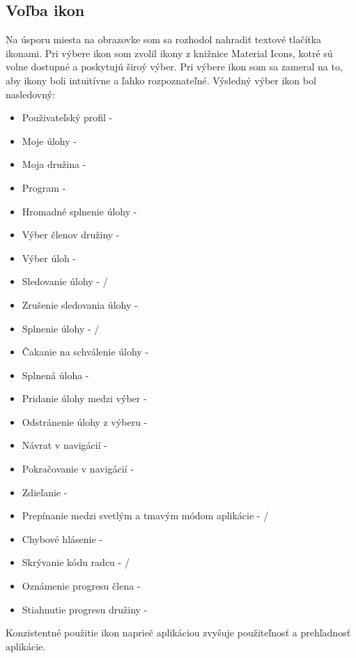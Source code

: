 \subsection{Voľba ikon}
Na úsporu miesta na obrazovke som sa rozhodol nahradiť textové tlačítka ikonami. Pri výbere ikon som zvolil ikony z knižnice Material Icons, kotré sú volne dostupné a poskytujú široý výber. Pri výbere ikon som sa zameral na to, aby ikony boli intuitívne a ľahko rozpoznateľné. Výsledný výber ikon bol nasledovný:
\begin{itemize}
    \item Použivateľský profil - 
    \item Moje úlohy - 
    \item Moja družina - 
    \item Program - 
    \item Hromadné splnenie úlohy - 
    \item Výber členov družiny - 
    \item Výber úloh - 
    \item Sledovanie úlohy -  / 
    \item Zrušenie sledovania úlohy - 
    \item Splnenie úlohy -  / 
    \item Čakanie na schválenie úlohy - 
    \item Splnená úloha - 
    \item Pridanie úlohy medzi výber - 
    \item Odstránenie úlohy z výberu - 
    \item Návrat v navigácií - 
    \item Pokračovanie v navigácií - 
    \item Zdieľanie - 
    \item Prepínanie medzi svetlým a tmavým módom aplikácie -  / 
    \item Chybové hlásenie - 
    \item Skrývanie kódu radcu -  / 
    \item Oznámenie progresu člena - 
    \item Stiahnutie progresu družiny - 
\end{itemize}
Konzistentné použitie ikon naprieč aplikáciou zvyšuje použiteľnosť a prehľadnosť aplikácie.


